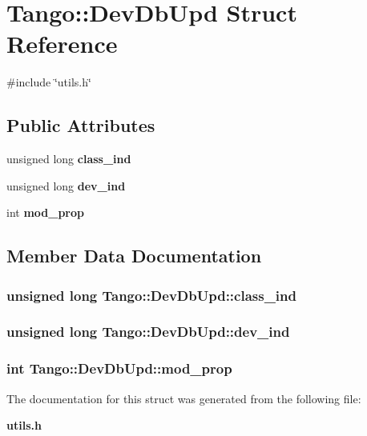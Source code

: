 \section{Tango\-:\-:Dev\-Db\-Upd Struct Reference}
\label{structTango_1_1DevDbUpd}


{\ttfamily \#include \char`\"{}utils.\-h\char`\"{}}

\subsection*{Public Attributes}
\begin{DoxyCompactItemize}
\item 
unsigned long {\bf class\-\_\-ind}
\item 
unsigned long {\bf dev\-\_\-ind}
\item 
int {\bf mod\-\_\-prop}
\end{DoxyCompactItemize}


\subsection{Member Data Documentation}
\subsubsection[{class\-\_\-ind}]{\setlength{\rightskip}{0pt plus 5cm}unsigned long Tango\-::\-Dev\-Db\-Upd\-::class\-\_\-ind}\label{structTango_1_1DevDbUpd_a3665ce564deae9a35f51c41d7038e529}
\subsubsection[{dev\-\_\-ind}]{\setlength{\rightskip}{0pt plus 5cm}unsigned long Tango\-::\-Dev\-Db\-Upd\-::dev\-\_\-ind}\label{structTango_1_1DevDbUpd_a38a8627129626359064789f8f600b579}
\subsubsection[{mod\-\_\-prop}]{\setlength{\rightskip}{0pt plus 5cm}int Tango\-::\-Dev\-Db\-Upd\-::mod\-\_\-prop}\label{structTango_1_1DevDbUpd_a937cf0da3cefa83ad3ae61f8a9dcad1f}


The documentation for this struct was generated from the following file\-:\begin{DoxyCompactItemize}
\item 
{\bf utils.\-h}\end{DoxyCompactItemize}
